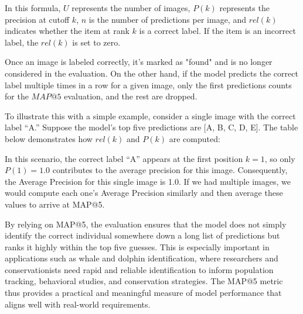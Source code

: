 \documentclass[twocolumn]{article}
\begin{document}
In this formula, \(U\) represents the number of images, \(P(k)\) represents the precision at cutoff \(k\), \(n\) is the number of predictions per image, and \(rel(k)\) indicates whether the item at rank \(k\) is a correct label. If the item is an incorrect label, the \(rel(k)\) is set to zero.

Once an image is labeled correctly, it's marked as "found" and is no longer considered in the evaluation. On the other hand, if the model predicts the correct label multiple times in a row for a given image, only the first predictions counts for the \(MAP@5\) evaluation, and the rest are dropped.

To illustrate this with a simple example, consider a single image with the correct label “A.” Suppose the model’s top five predictions are [A, B, C, D, E]. The table below demonstrates how \( rel(k) \) and \( P(k) \) are computed:

\begin{table}[ht!]
\centering
\renewcommand{\arraystretch}{1.5} %
\caption{Example computation of \( rel(k) \) and \( P(k) \) for an image with the correct label “A.” The first prediction is correct, so \( rel(k) \) is 1 for \( k = 1 \), and subsequent predictions contribute 0.}
\label{tab:map5_example}
\end{table}

In this scenario, the correct label “A” appears at the first position \( k=1 \), so only \( P(1) = 1.0 \) contributes to the average precision for this image. Consequently, the Average Precision for this single image is 1.0. If we had multiple images, we would compute each one’s Average Precision similarly and then average these values to arrive at MAP@5.

By relying on MAP@5, the evaluation ensures that the model does not simply identify the correct individual somewhere down a long list of predictions but ranks it highly within the top five guesses. This is especially important in applications such as whale and dolphin identification, where researchers and conservationists need rapid and reliable identification to inform population tracking, behavioral studies, and conservation strategies. The MAP@5 metric thus provides a practical and meaningful measure of model performance that aligns well with real-world requirements.
\end{document}
